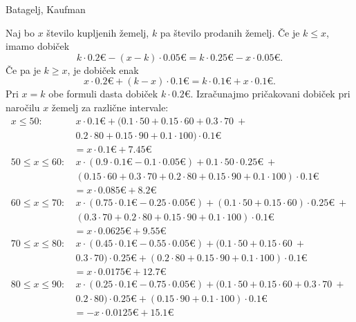 \begin{naloga}{Batagelj, Kaufman}{\cite[Naloga~4.2]{bk}}
\begin{odgovor}
Naj bo $x$ število kupljenih žemelj, $k$ pa število prodanih žemelj.
Če je $k \le x$, imamo dobiček
$$
k \cdot 0.2 € - (x-k) \cdot 0.05 € = k \cdot 0.25 € - x \cdot 0.05 € .
$$
Če pa je $k \ge x$, je dobiček enak
$$
x \cdot 0.2 € + (k-x) \cdot 0.1 € = k \cdot 0.1 € + x \cdot 0.1 € .
$$
Pri $x = k$ obe formuli dasta dobiček $k \cdot 0.2 €$.
Izračunajmo pričakovani dobiček pri naročilu $x$ žemelj za različne intervale:
\begin{align*}
x \le 50:         &\ x \cdot 0.1 € +
                     (0.1 \cdot 50 + 0.15 \cdot 60 + 0.3 \cdot 70 \ + \\
                  &\  0.2 \cdot 80 + 0.15 \cdot 90 + 0.1 \cdot 100)
                     \cdot 0.1 € \\
                  &= x \cdot 0.1 € + 7.45 € \\
50 \le x \le 60:  &\ x \cdot (0.9 \cdot 0.1 € - 0.1 \cdot 0.05 €) +
                     0.1 \cdot 50 \cdot 0.25 € \ + \\
                  &\ (0.15 \cdot 60 + 0.3 \cdot 70 + 0.2 \cdot 80 +
                      0.15 \cdot 90 + 0.1 \cdot 100) \cdot 0.1 € \\
                  &= x \cdot 0.085 € + 8.2 € \\
60 \le x \le 70:  &\ x \cdot (0.75 \cdot 0.1 € - 0.25 \cdot 0.05 €) +
                     (0.1 \cdot 50 + 0.15 \cdot 60) \cdot 0.25 € \ + \\
                  &\ (0.3 \cdot 70 + 0.2 \cdot 80 + 0.15 \cdot 90 +
                      0.1 \cdot 100) \cdot 0.1 € \\
                  &=  x \cdot 0.0625 € + 9.55 € \\
70 \le x \le 80:  &\ x \cdot (0.45 \cdot 0.1 € - 0.55 \cdot 0.05 €) +
                     (0.1 \cdot 50 + 0.15 \cdot 60 \ + \\
                  &\ 0.3 \cdot 70) \cdot 0.25 € +
                     (0.2 \cdot 80 + 0.15 \cdot 90 + 0.1 \cdot 100)
                     \cdot 0.1 € \\
                  &= x \cdot 0.0175 € + 12.7 € \\
80 \le x \le 90:  &\ x \cdot (0.25 \cdot 0.1 € - 0.75 \cdot 0.05 €) +
                     (0.1 \cdot 50 + 0.15 \cdot 60 + 0.3 \cdot 70 \ + \\
                  &\  0.2 \cdot 80) \cdot 0.25 € +
                     (0.15 \cdot 90 + 0.1 \cdot 100) \cdot 0.1 € \\
                  &= -x \cdot 0.0125 € + 15.1 € \\

\end{align*}
\end{odgovor}
\end{naloga}

